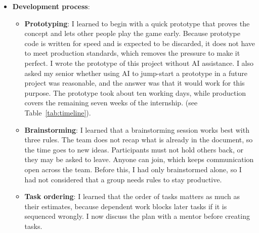 \begin{itemize}[label=-]
    \item \textbf{Development process}:
    \begin{itemize}[label=$\circ$]
        \item \textbf{Prototyping}: I learned to begin with a quick prototype that proves the concept and lets other people play the game early. Because prototype code is written for speed and is expected to be discarded, it does not have to meet production standards, which removes the pressure to make it perfect. I wrote the prototype of this project without AI assistance. I also asked my senior whether using AI to jump-start a prototype in a future project was reasonable, and the answer was that it would work for this purpose. The prototype took about ten working days, while production covers the remaining seven weeks of the internship. (see Table~\ref{tab:timeline}).
        \item \textbf{Brainstorming}: I learned that a brainstorming session works best with three rules. The team does not recap what is already in the document, so the time goes to new ideas. Participants must not hold others back, or they may be asked to leave. Anyone can join, which keeps communication open across the team. Before this, I had only brainstormed alone, so I had not considered that a group needs rules to stay productive.
        \item \textbf{Task ordering}: I learned that the order of tasks matters as much as their estimates, because dependent work blocks later tasks if it is sequenced wrongly. I now discuss the plan with a mentor before creating tasks.
    \end{itemize}


\end{itemize}
